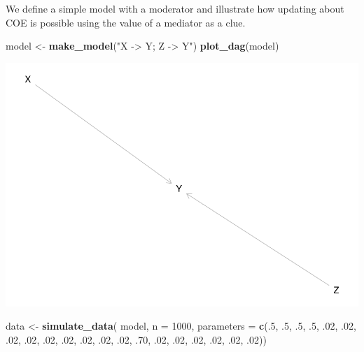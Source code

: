 \documentclass[12pt,]{book}
\newenvironment{Shaded}{\begin{snugshade}}{\end{snugshade}}
\newcommand{\DataTypeTok}[1]{\textcolor[rgb]{0.13,0.29,0.53}{#1}}
\newcommand{\DecValTok}[1]{\textcolor[rgb]{0.00,0.00,0.81}{#1}}
\newcommand{\FloatTok}[1]{\textcolor[rgb]{0.00,0.00,0.81}{#1}}
\newcommand{\KeywordTok}[1]{\textcolor[rgb]{0.13,0.29,0.53}{\textbf{#1}}}
\newcommand{\NormalTok}[1]{#1}
\newcommand{\StringTok}[1]{\textcolor[rgb]{0.31,0.60,0.02}{#1}}
\begin{document}
We define a simple model with a moderator and illustrate how updating about COE is possible using the value of a mediator as a clue.

\begin{Shaded}
\begin{Highlighting}[]
\NormalTok{model <-}\StringTok{ }\KeywordTok{make_model}\NormalTok{(}\StringTok{"X -> Y; Z -> Y"}\NormalTok{) }
\KeywordTok{plot_dag}\NormalTok{(model)}
\end{Highlighting}
\end{Shaded}

\includegraphics{ii_files/figure-latex/unnamed-chunk-118-1.pdf}

\begin{Shaded}
\begin{Highlighting}[]
\NormalTok{data <-}\StringTok{ }\KeywordTok{simulate_data}\NormalTok{(}
\NormalTok{    model, }\DataTypeTok{n =} \DecValTok{1000}\NormalTok{, }
    \DataTypeTok{parameters =} \KeywordTok{c}\NormalTok{(.}\DecValTok{5}\NormalTok{, }\FloatTok{.5}\NormalTok{, }\FloatTok{.5}\NormalTok{, }\FloatTok{.5}\NormalTok{, }
                   \FloatTok{.02}\NormalTok{, }\FloatTok{.02}\NormalTok{, }\FloatTok{.02}\NormalTok{, }\FloatTok{.02}\NormalTok{, }\FloatTok{.02}\NormalTok{, }\FloatTok{.02}\NormalTok{, }\FloatTok{.02}\NormalTok{, }\FloatTok{.02}\NormalTok{,}
                   \FloatTok{.02}\NormalTok{, }\FloatTok{.70}\NormalTok{, }\FloatTok{.02}\NormalTok{, }\FloatTok{.02}\NormalTok{, }\FloatTok{.02}\NormalTok{, }\FloatTok{.02}\NormalTok{, }\FloatTok{.02}\NormalTok{, }\FloatTok{.02}\NormalTok{))}
\end{Highlighting}
\end{Shaded}
\end{document}
